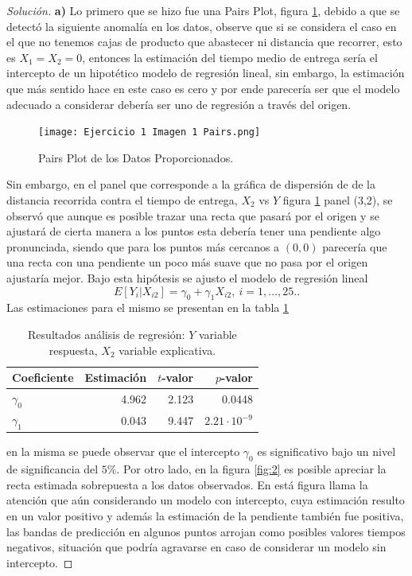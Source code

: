 \documentclass[10.5pt,notitlepage]{article}
\newenvironment{solucion}
  {\begin{proof}[Solución]}
  {\end{proof}}
\theoremstyle{plain}
\begin{document}
\begin{solucion}
\noindent \textbf{a)} Lo primero que se hizo fue una Pairs Plot, figura \ref{fig:1}, debido a que se detectó la siguiente anomalía en los datos, observe que si se considera el caso en el que no tenemos cajas de producto que abastecer ni distancia que recorrer, esto es \(X_1 = X_2 = 0\), entonces la estimación del tiempo medio de entrega sería el intercepto de un hipotético modelo de regresión lineal, sin embargo, la estimación que más sentido hace en este caso es cero y por ende parecería ser que el modelo adecuado a considerar debería ser uno de regresión a través del origen.    
\begin{figure}[htb]
 \centering
 \texttt{[image: Ejercicio 1 Imagen 1 Pairs.png]}
 \caption{Pairs Plot de los Datos Proporcionados.}
\label{fig:1}
\end{figure}
Sin embargo, en el panel que corresponde a la gráfica de dispersión de de la distancia recorrida contra el tiempo de entrega, \(X_2\) vs \(Y\) figura \ref{fig:1} panel (3,2), se observó que aunque es posible trazar una recta que pasará por el origen y se ajustará de cierta manera a los puntos esta debería tener una pendiente algo pronunciada, siendo que para los puntos más cercanos a \((0,0)\) parecería que una recta con una pendiente un poco más suave que no pasa por el origen ajustaría mejor. Bajo esta hipótesis se ajusto el modelo de regresión lineal
\begin{equation*}
    E[Y_{i}|X_{i2}] = \gamma_{0} + \gamma_{1}X_{i2}, \ i =1, \hdots,25. . 
\end{equation*}
Las estimaciones para el mismo se presentan en la tabla \ref{tab:ref1}
\begin{table}[H]
        \centering
        \begin{tabular}{@{}l@{\hskip 0.3in}r@{\hskip 0.3in}r@{\hskip 0.3in}r@{}}
            \toprule
            Coeficiente& Estimación & \(t\)-valor& \(p\)-valor \\
            \midrule
            \(\gamma_0\) & 4.962 &  2.123& 0.0448\\
            \(\gamma_1\) & 0.043 &  9.447& \(2.21\cdot10^{-9}\)\\ 
            \bottomrule
        \end{tabular}
        \caption{Resultados análisis de regresión: \(Y\) variable respuesta, \(X_2\) variable explicativa.}
        \label{tab:ref1}
\end{table}
en la misma se puede observar que el intercepto \(\gamma_0\) es significativo bajo un nivel de significancia del \(5\%\). Por otro lado, en la figura \ref{fig:2} es posible apreciar la recta estimada sobrepuesta a los datos observados. En está figura llama la atención que aún considerando un modelo con intercepto, cuya estimación resulto en un valor positivo y además la estimación de la pendiente también fue positiva, las bandas de predicción en algunos puntos arrojan como posibles valores tiempos negativos, situación que podría agravarse en caso de considerar un modelo sin intercepto.

\end{solucion}
\end{document}
